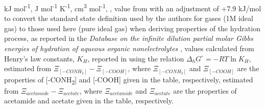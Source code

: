 \begin{table}
\begin{threeparttable}
\begin{tablenotes}
     kJ mol\textsuperscript{-1},
     J mol\textsuperscript{-1} K\textsuperscript{-1},
     cm\textsuperscript{3} mol\textsuperscript{-1},
     \cite{dick2006temperature},
     value from \cite{cabani1981group} with an adjustment of +7.9 kJ/mol to convert the standard state definition used by the authors for gases (1M ideal gas) to those used here (pure ideal gas) when deriving properties of the hydration process, as reported in the \textit{Database on the infinite dilution  partial  molar Gibbs  energies of hydration of aqueous organic nonelectrolytes} \citep{sedlbauer2012database, sedlbauer2002group},
     values calculated from Henry's law constants, $K_{H}$, reported in \cite{khan1992henry} using the relation $\Delta_{h}G^{\circ} = -RT\ln{K_{H}}$,
     estimated from $\Xi_{[-CONH_{2}]} - \Xi_{[-COOH]}$, where $\Xi_{[-CONH_{2}]}$ and $\Xi_{[-COOH]}$ are the properties of [-CONH\textsubscript{2}] and [-COOH] given in the table, respectively,
     estimated from $\Xi_{acetamide} - \Xi_{acetate}$, where $\Xi_{acetamide}$ and $\Xi_{acetate}$ are the properties of acetamide and acetate given in the table, respectively.
    
        
  \end{tablenotes}
  
  \label{tab:amide}
  \end{threeparttable}
\end{table}
\setcounter{tabcounter}{0} %
\doublespace





